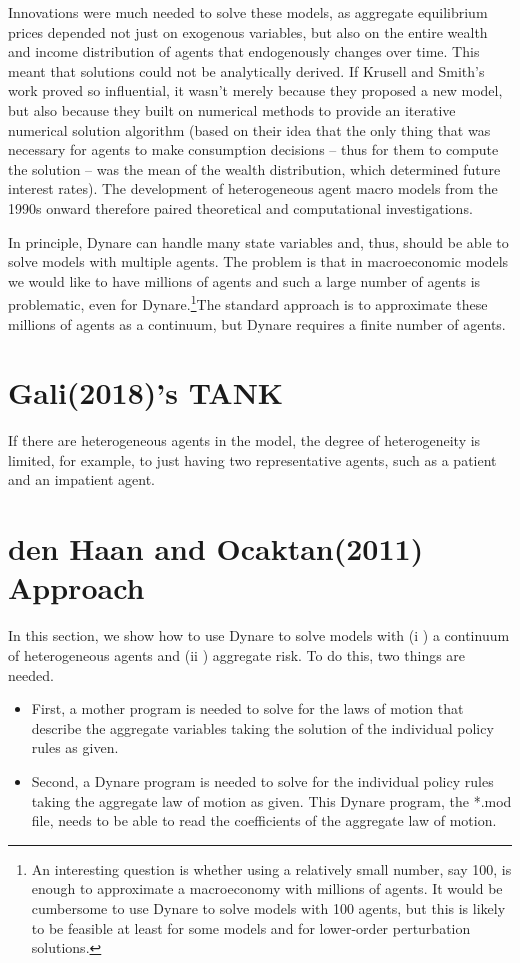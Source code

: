 \documentclass[10pt,math=newtx,citestyle=gb7714-2015,bibstyle=gb7714-2015]{elegantbook}
\begin{document}
{	Innovations were much needed to solve these models, as aggregate equilibrium prices depended not just on exogenous variables, but also on the entire wealth and income distribution of agents that endogenously changes over time. This meant that solutions could not be analytically derived. If Krusell and Smith’s work proved so influential, it wasn’t merely because they proposed a new model, but also because they built on numerical methods to provide an iterative numerical solution algorithm (based on their idea that the only thing that was necessary for agents to make consumption decisions – thus for them to compute the solution – was the mean of the wealth distribution, which determined future interest rates). The development of heterogeneous agent macro models from the 1990s onward therefore paired theoretical and computational investigations.
	
	In principle, Dynare can handle many state variables and, thus, should be able to solve models with multiple agents. The problem is that in macroeconomic models we would like to have millions of agents and such a large number of agents is problematic, even for Dynare.\footnote{An interesting question is whether using a relatively small number, say 100, is enough to approximate a macroeconomy with millions of agents. It would be cumbersome to use Dynare to solve models with 100 agents, but this is likely to be feasible at least for some models and for lower-order perturbation solutions.}The standard approach is to approximate these millions of agents as a continuum, but Dynare requires a finite number of agents.
	
	\section{Gali(2018)'s TANK}
	
	If there are heterogeneous agents in the model, the degree of heterogeneity is limited, for example, to just having two representative agents, such as a patient and an impatient agent.
	
	
	\section{den Haan and Ocaktan(2011) Approach}
	
	In this section, we show how to use Dynare to solve models with (i ) a continuum of heterogeneous agents and (ii ) aggregate risk. To do this, two things are needed.
	\begin{itemize}
		\item First, a mother program is needed to solve for the laws of motion that describe the aggregate variables taking the solution of the individual policy rules as given.
		\item Second, a Dynare program is needed to solve for the individual policy rules taking the aggregate law of motion as given. This Dynare program, the *.mod file, needs to be able to read the coefficients of the aggregate law of motion.
	\end{itemize}
	
}
\end{document}
